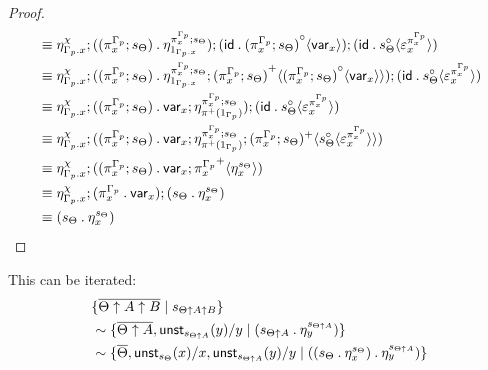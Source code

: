 \documentclass[10pt]{article}
\theoremstyle{definition}
\newcommand\UnSt[2]{\ensuremath{\mathsf{unst}_{#1}(#2)}}
\newcommand\TrPlus[2]{\ensuremath{{#1}^+(#2)}}
\newcommand\var[1]{\ensuremath{\mathsf{var}_{#1}}}
\newcommand{\id}{\mathsf{id}}
\newcommand\ap[2]{\ensuremath{#1 \langle #2 \rangle }}
\newcommand\bdot[0]{\mathbin{.}}
\begin{document}
\begin{proof}
\begin{align*}
&\equiv \eta^\chi_{\asdep{\Gamma}.x} ; ((\pi^{\asdep{\Gamma}}_x;s_\Theta) \bdot \eta^{\pi^{\asdep{\Gamma}}_x;s_\Theta}_{1_{\asdep{\Gamma}.x}}) ; (\id \bdot \ap{{(\pi^{\asdep{\Gamma}}_x;s_\Theta)}^\circ}{\var{x}}) ; (\id \bdot \ap{s_\Theta^\circ}{\varepsilon^{\pi^{\asdep{\Gamma}}_x}_x}) \\
&\equiv \eta^\chi_{\asdep{\Gamma}.x} ; ((\pi^{\asdep{\Gamma}}_x;s_\Theta) \bdot \eta^{\pi^{\asdep{\Gamma}}_x;s_\Theta}_{1_{\asdep{\Gamma}.x}} ; \ap{{(\pi^{\asdep{\Gamma}}_x;s_\Theta)}^+}{\ap{{(\pi^{\asdep{\Gamma}}_x;s_\Theta)}^\circ}{\var{x}}})  ; (\id \bdot \ap{s_\Theta^\circ}{\varepsilon^{\pi^{\asdep{\Gamma}}_x}_x}) \\
&\equiv \eta^\chi_{\asdep{\Gamma}.x} ; ((\pi^{\asdep{\Gamma}}_x;s_\Theta) \bdot \var{x};\eta^{\pi^{\asdep{\Gamma}}_x;s_\Theta}_{\TrPlus{\pi}{1_{\asdep{\Gamma}}}})  ; (\id \bdot \ap{s_\Theta^\circ}{\varepsilon^{\pi^{\asdep{\Gamma}}_x}_x}) \\
&\equiv \eta^\chi_{\asdep{\Gamma}.x} ; ((\pi^{\asdep{\Gamma}}_x;s_\Theta) \bdot \var{x};\eta^{\pi^{\asdep{\Gamma}}_x;s_\Theta}_{\TrPlus{\pi}{1_{\asdep{\Gamma}}}};\ap{(\pi^{\asdep{\Gamma}}_x;s_\Theta)^+}{\ap{s_\Theta^\circ}{\varepsilon^{\pi^{\asdep{\Gamma}}_x}_x}}) \\
&\equiv \eta^\chi_{\asdep{\Gamma}.x} ; ((\pi^{\asdep{\Gamma}}_x;s_\Theta) \bdot \var{x};\ap{{\pi^{\asdep{\Gamma}}_x}^+}{\eta^{s_\Theta}_x}) \\
&\equiv \eta^\chi_{\asdep{\Gamma}.x} ; (\pi^{\asdep{\Gamma}}_x \bdot \var{x}) ; (s_\Theta \bdot \eta^{s_\Theta}_x) \\
&\equiv (s_\Theta \bdot \eta^{s_\Theta}_x)
\end{align*}
\end{proof}

This can be iterated:
\begin{align*}
& \{ \upstairs{\Theta \uparrow A \uparrow B} \mid s_{\Theta \uparrow A \uparrow B} \} \\
&\sim \{ \upstairs{\Theta \uparrow A}, \UnSt{s_{\Theta \uparrow A}}{y}/y \mid (s_{\Theta \uparrow A} \bdot \eta^{s_{\Theta \uparrow A}}_y) \} \\
&\sim \{ \upstairs{\Theta}, \UnSt{s_{\Theta}}{x}/x, \UnSt{s_{\Theta \uparrow A}}{y}/y \mid ((s_{\Theta} \bdot \eta^{s_{\Theta}}_x) \bdot \eta^{s_{\Theta \uparrow A}}_y) \}
\end{align*}
\end{document}
